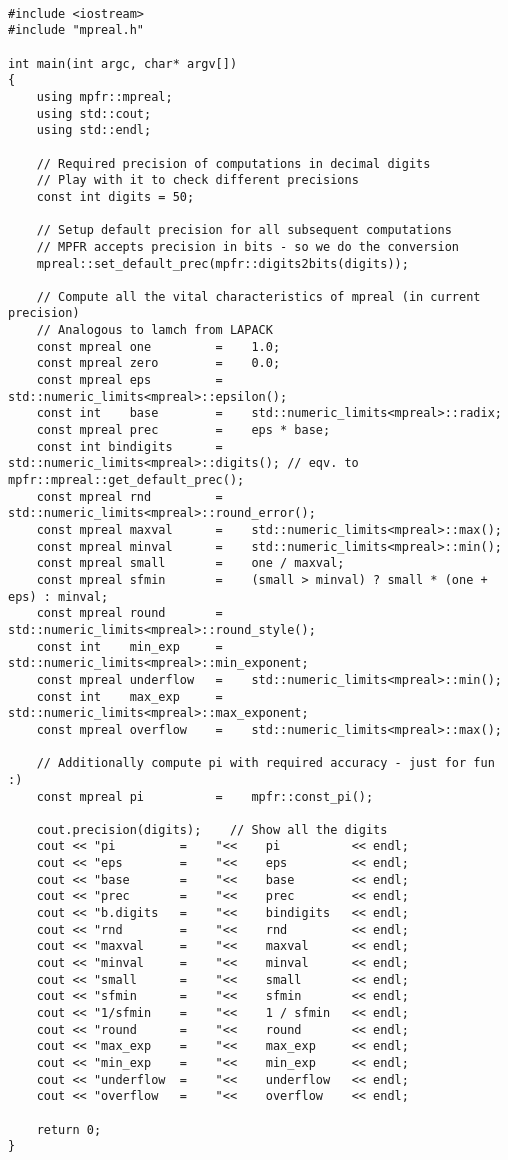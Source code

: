 \begin{lstlisting}

#include <iostream>
#include "mpreal.h"

int main(int argc, char* argv[])
{
    using mpfr::mpreal;    
    using std::cout;
    using std::endl;
    
    // Required precision of computations in decimal digits
    // Play with it to check different precisions
    const int digits = 50; 

    // Setup default precision for all subsequent computations
    // MPFR accepts precision in bits - so we do the conversion 
    mpreal::set_default_prec(mpfr::digits2bits(digits));

    // Compute all the vital characteristics of mpreal (in current precision)
    // Analogous to lamch from LAPACK
    const mpreal one         =    1.0;
    const mpreal zero        =    0.0;
    const mpreal eps         =    std::numeric_limits<mpreal>::epsilon();
    const int    base        =    std::numeric_limits<mpreal>::radix;
    const mpreal prec        =    eps * base;
    const int bindigits      =    std::numeric_limits<mpreal>::digits(); // eqv. to mpfr::mpreal::get_default_prec();
    const mpreal rnd         =    std::numeric_limits<mpreal>::round_error();
    const mpreal maxval      =    std::numeric_limits<mpreal>::max();
    const mpreal minval      =    std::numeric_limits<mpreal>::min();
    const mpreal small       =    one / maxval;
    const mpreal sfmin       =    (small > minval) ? small * (one + eps) : minval;
    const mpreal round       =    std::numeric_limits<mpreal>::round_style();
    const int    min_exp     =    std::numeric_limits<mpreal>::min_exponent;
    const mpreal underflow   =    std::numeric_limits<mpreal>::min();
    const int    max_exp     =    std::numeric_limits<mpreal>::max_exponent;
    const mpreal overflow    =    std::numeric_limits<mpreal>::max();
    
    // Additionally compute pi with required accuracy - just for fun :)
    const mpreal pi          =    mpfr::const_pi();
        
    cout.precision(digits);    // Show all the digits
    cout << "pi         =    "<<    pi          << endl;    
    cout << "eps        =    "<<    eps         << endl;
    cout << "base       =    "<<    base        << endl;
    cout << "prec       =    "<<    prec        << endl;
    cout << "b.digits   =    "<<    bindigits   << endl;
    cout << "rnd        =    "<<    rnd         << endl;
    cout << "maxval     =    "<<    maxval      << endl;    
    cout << "minval     =    "<<    minval      << endl;    
    cout << "small      =    "<<    small       << endl;    
    cout << "sfmin      =    "<<    sfmin       << endl;    
    cout << "1/sfmin    =    "<<    1 / sfmin   << endl;    
    cout << "round      =    "<<    round       << endl;    
    cout << "max_exp    =    "<<    max_exp     << endl;
    cout << "min_exp    =    "<<    min_exp     << endl;
    cout << "underflow  =    "<<    underflow   << endl;    
    cout << "overflow   =    "<<    overflow    << endl;

    return 0;
}

\end{lstlisting}
